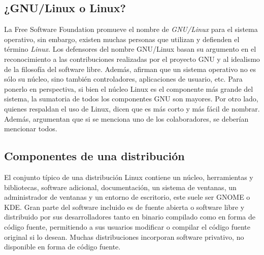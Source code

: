 \subsection{¿GNU/Linux o Linux?}

La Free Software Foundation promueve el nombre de \textit{GNU/Linux} para el sistema operativo, sin embargo, existen muchas personas que utilizan y defienden el término \textit{Linux}.
Los defensores del nombre GNU/Linux basan su argumento en el reconocimiento a las contribuciones realizadas por el proyecto GNU y al idealismo de la filosofía del software libre. Además, afirman que un sistema operativo no es sólo su núcleo, sino también controladores, aplicaciones de usuario, etc.
Para ponerlo en perspectiva, si bien el núcleo Linux es el componente más grande del sistema, la sumatoria de todos los componentes GNU son mayores.
Por otro lado, quienes respaldan el uso de Linux, dicen que es más corto y más fácil de nombrar. Además, argumentan que si se menciona uno de los colaboradores, se deberían mencionar todos.

\subsection{Componentes de una distribución}

El conjunto típico de una distribución Linux contiene un núcleo, herramientas y bibliotecas, software adicional, documentación, un sistema de ventanas, un administrador de ventanas y un entorno de escritorio, este suele ser GNOME o KDE. Gran parte del software incluido es de fuente abierta o software libre y distribuido por sus desarrolladores tanto en binario compilado como en forma de código fuente, permitiendo a sus usuarios modificar o compilar el código fuente original si lo desean. Muchas distribuciones incorporan software privativo, no disponible en forma de código fuente.

